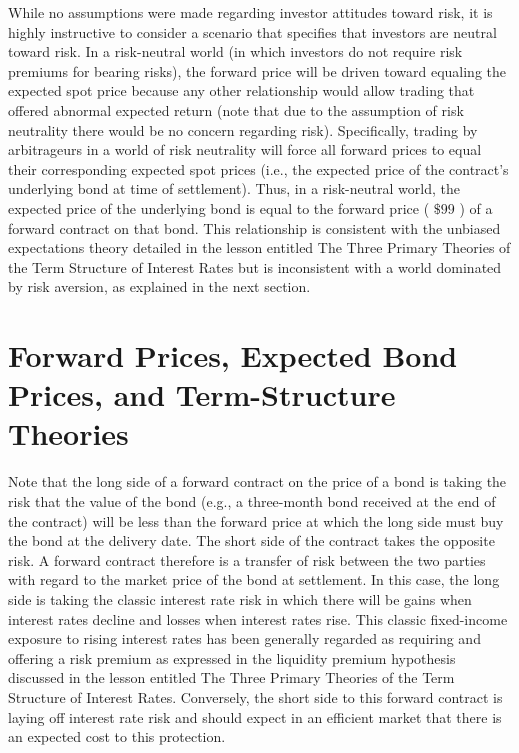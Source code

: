 \documentclass[11pt]{article}
\begin{document}
While no assumptions were made regarding investor attitudes toward risk, it is highly instructive to consider a scenario that specifies that investors are neutral toward risk. In a risk-neutral world (in which investors do not require risk premiums for bearing risks), the forward price will be driven toward equaling the expected spot price because any other relationship would allow trading that offered abnormal expected return (note that due to the assumption of risk neutrality there would be no concern regarding risk). Specifically, trading by arbitrageurs in a world of risk neutrality will force all forward prices to equal their corresponding expected spot prices (i.e., the expected price of the contract's underlying bond at time of settlement). Thus, in a risk-neutral world, the expected price of the underlying bond is equal to the forward price ( $\$ 99$ ) of a forward contract on that bond. This relationship is consistent with the unbiased expectations theory detailed in the lesson entitled The Three Primary Theories of the Term Structure of Interest Rates but is inconsistent with a world dominated by risk aversion, as explained in the next section.

\section*{Forward Prices, Expected Bond Prices, and Term-Structure Theories}
Note that the long side of a forward contract on the price of a bond is taking the risk that the value of the bond (e.g., a three-month bond received at the end of the contract) will be less than the forward price at which the long side must buy the bond at the delivery date. The short side of the contract takes the opposite risk. A forward contract therefore is a transfer of risk between the two parties with regard to the market price of the bond at settlement. In this case, the long side is taking the classic interest rate risk in which there will be gains when interest rates decline and losses when interest rates rise. This classic fixed-income exposure to rising interest rates has been generally regarded as requiring and offering a risk premium as expressed in the liquidity premium hypothesis discussed in the lesson entitled The Three Primary Theories of the Term Structure of Interest Rates. Conversely, the short side to this forward contract is laying off interest rate risk and should expect in an efficient market that there is an expected cost to this protection.
\end{document}
